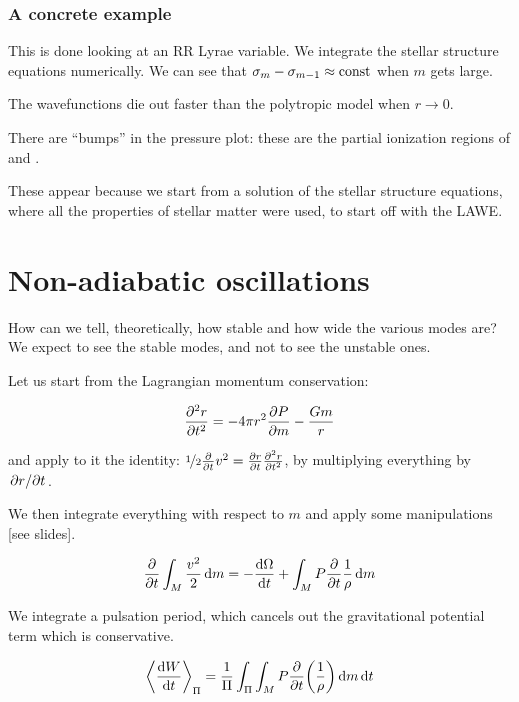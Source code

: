 \documentclass[main.tex]{subfiles}
\begin{document}
\subsubsection{A concrete example}

This is done looking at an RR Lyrae variable.
We integrate the stellar structure equations numerically.
We can see that \(\sigma_m - \sigma_{m-1} \approx \text{const}\) when \(m\) gets large.

The wavefunctions die out faster than the polytropic model when \(r \rightarrow 0\).

There are ``bumps'' in the pressure plot: these are the partial ionization regions of  and .

These appear because we start from a solution of the stellar structure equations, where all the properties of stellar matter were used, to start off with the LAWE.

\section{Non-adiabatic oscillations}

How can we tell, theoretically, how stable and how wide the various modes are?
We expect to see the stable modes, and not to see the unstable ones.

Let us start from the Lagrangian momentum conservation:

\begin{equation}
    \pdv[2]{r}{t} = - 4 \pi r^2 \pdv{P}{m} - \frac{Gm}{r}
\end{equation}

and apply to it the identity: \(\frac[i]{1}{2} \pdv{}{t} v^2 = \pdv{r}{t} \pdv[2]{r}{t}\), by multiplying everything by \(\pdv*{r}{t} \).

We then integrate everything with respect to \(m\) and apply some manipulations [see slides].

\begin{equation}
  \pdv{}{t} \int_M \frac{v^2}{2} \dd{m} =
  - \dv{\Omega}{t} + \int_M P \pdv{}{t} \frac{1}{\rho} \dd{m}
\end{equation}

We integrate a pulsation period, which cancels out the gravitational potential term which is conservative.

\begin{equation}
  \expval{\dv{W}{t}}_\Pi = \frac{1}{\Pi} \int_\Pi \int_M   P \pdv{}{t} \qty(\frac{1}{\rho}) \dd{m} \dd{t}
\end{equation}
\end{document}
